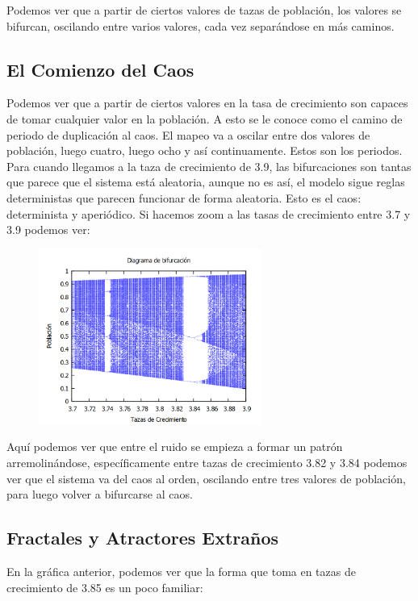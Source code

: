 \documentclass[a4paper]{article}
\begin{document}
Podemos ver que a partir de ciertos valores de tazas de población, los valores se bifurcan, oscilando entre varios valores, cada vez separándose en más caminos.

\subsection{El Comienzo del Caos}

Podemos ver que a partir de ciertos valores en la tasa de crecimiento son capaces de tomar cualquier valor en la población. A esto se le conoce como el camino de periodo de duplicación al caos. El mapeo va a oscilar entre dos valores de población, luego cuatro, luego ocho y así continuamente. Estos son los periodos. Para cuando llegamos a la taza de crecimiento de 3.9, las bifurcaciones son tantas que parece que el sistema está aleatoria, aunque no es así, el modelo sigue reglas deterministas que parecen funcionar de forma aleatoria. Esto es el caos: determinista y aperiódico. Si hacemos zoom a las tasas de crecimiento entre 3.7 y 3.9 podemos ver:

\begin{figure}[!ht]
 \centering
  \includegraphics[width=0.65\textwidth]{Bifurcacion37-39.png}
\end{figure}

\pagebreak

Aquí podemos ver que entre el ruido se empieza a formar un patrón arremolinándose, específicamente entre tazas de crecimiento 3.82 y 3.84 podemos ver que el sistema va del caos al orden, oscilando entre tres valores de población, para luego volver a bifurcarse al caos.

\subsection{Fractales y Atractores Extraños}
En la gráfica anterior, podemos ver que la forma que toma en tazas de crecimiento de 3.85 es un poco familiar:
\end{document}
